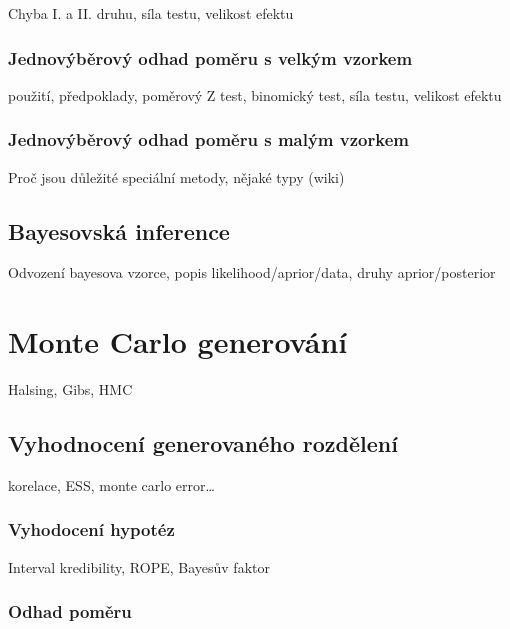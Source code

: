 \documentclass[
  11pt,
  a4paper]{report}
\begin{document}
Chyba I. a II. druhu, síla testu, velikost efektu

\subsection{Jednovýběrový odhad poměru s velkým
vzorkem}\label{jednovuxfdbux11brovuxfd-odhad-pomux11bru-s-velkuxfdm-vzorkem}

použití, předpoklady, poměrový Z test, binomický test, síla testu,
velikost efektu

\subsection{Jednovýběrový odhad poměru s malým
vzorkem}\label{jednovuxfdbux11brovuxfd-odhad-pomux11bru-s-maluxfdm-vzorkem}

Proč jsou důležité speciální metody, nějaké typy (wiki)

\section{Bayesovská inference}\label{bayesovskuxe1-inference}

Odvození bayesova vzorce, popis likelihood/aprior/data, druhy
aprior/posterior

\chapter{Monte Carlo generování}\label{monte-carlo-generovuxe1nuxed}

Halsing, Gibs, HMC

\section{Vyhodnocení generovaného
rozdělení}\label{vyhodnocenuxed-generovanuxe9ho-rozdux11blenuxed}

korelace, ESS, monte carlo error\ldots{}

\subsection{Vyhodocení hypotéz}\label{vyhodocenuxed-hypotuxe9z}

Interval kredibility, ROPE, Bayesův faktor

\subsection{Odhad poměru}\label{odhad-pomux11bru}
\end{document}

